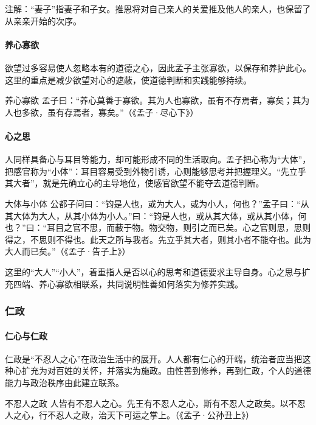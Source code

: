 注解：“妻子”指妻子和子女。推恩将对自己亲人的关爱推及他人的亲人，也保留了从亲亲开始的次序。

\paragraph{养心寡欲}

欲望过多容易使人忽略本有的道德之心，因此孟子主张寡欲，以保存和养护此心。这里的重点是减少欲望对心的遮蔽，使道德判断和实践能够持续。

\begin{fancybox}{养心寡欲}
    孟子曰：“养心莫善于寡欲。其为人也寡欲，虽有不存焉者，寡矣；其为人也多欲，虽有存焉者，寡矣。”（《孟子·尽心下》）
\end{fancybox}

\paragraph{心之思}

人同样具备心与耳目等能力，却可能形成不同的生活取向。孟子把心称为“大体”，把感官称为“小体”：耳目容易受到外物引诱，心则能够思考并把握理义。“先立乎其大者”，就是先确立心的主导地位，使感官欲望不能夺去道德判断。

\begin{fancybox}{大体与小体}
    公都子问曰：“钧是人也，或为大人，或为小人，何也？”孟子曰：“从其大体为大人，从其小体为小人。”曰：“钧是人也，或从其大体，或从其小体，何也？”曰：“耳目之官不思，而蔽于物。物交物，则引之而已矣。心之官则思，思则得之，不思则不得也。此天之所与我者。先立乎其大者，则其小者不能夺也。此为大人而已矣。”（《孟子·告子上》）
\end{fancybox}

这里的“大人”“小人”，着重指人是否以心的思考和道德要求主导自身。心之思与扩充四端、养心寡欲相联系，共同说明性善如何落实为修养实践。

\subsubsection{仁政}

\paragraph{仁心与仁政}

仁政是“不忍人之心”在政治生活中的展开。人人都有仁心的开端，统治者应当把这种心扩充为对百姓的关怀，并落实为施政。由性善到修养，再到仁政，个人的道德能力与政治秩序由此建立联系。

\begin{fancybox}{不忍人之政}
    人皆有不忍人之心。先王有不忍人之心，斯有不忍人之政矣。以不忍人之心，行不忍人之政，治天下可运之掌上。（《孟子·公孙丑上》）
\end{fancybox}

